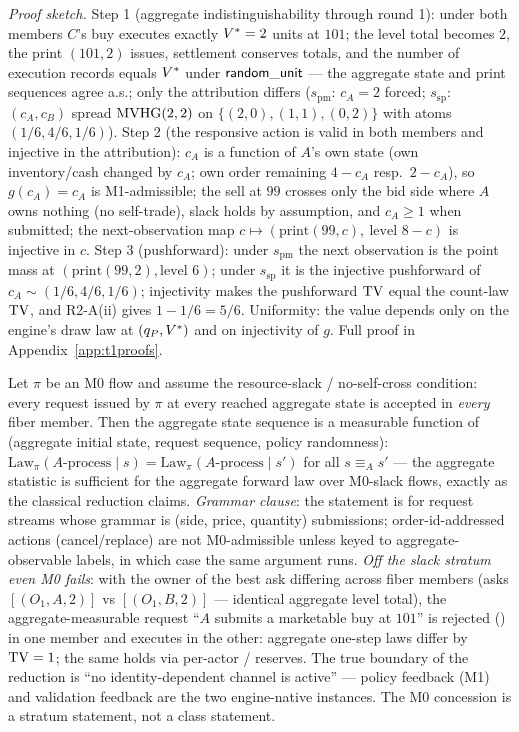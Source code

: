 \emph{Proof sketch.} Step 1 (aggregate indistinguishability through round
1): under both members $C$'s buy executes exactly $V^{*} = 2$ units at
$101$; the level total becomes $2$, the print $(101,2)$ issues, settlement
conserves totals, and the number of execution records equals $V^{*}$
under $\mathsf{random\_unit}$ --- the aggregate state and print sequences agree a.s.; only
the attribution differs ($s_{\mathrm{pm}}$: $c_A = 2$ forced;
$s_{\mathrm{sp}}$: $(c_A, c_B)$ spread $\operatorname{MVHG}(2,2)$ on
$\{(2,0),(1,1),(0,2)\}$ with atoms $(1/6, 4/6, 1/6)$). Step 2 (the
responsive action is valid in both members and injective in the
attribution): $c_A$ is a function of $A$'s own state (own inventory/cash
changed by $c_A$; own order remaining $4 - c_A$ resp.\ $2 - c_A$), so
$g(c_A) = c_A$ is M1-admissible; the sell at $99$ crosses only the bid side
where $A$ owns nothing (no self-trade), slack holds by assumption, and
$c_A \geq 1$ when submitted; the next-observation map $c \mapsto
(\text{print}(99,c),\ \text{level } 8-c)$ is injective in $c$. Step 3
(pushforward): under $s_{\mathrm{pm}}$ the next observation is the point
mass at $(\text{print}(99,2), \text{level }6)$; under $s_{\mathrm{sp}}$ it
is the injective pushforward of $c_A \sim (1/6,4/6,1/6)$; injectivity makes
the pushforward $\operatorname{TV}$ equal the count-law $\operatorname{TV}$, and R2-A(ii) gives $1 - 1/6
= 5/6$. Uniformity: the value depends only on the engine's draw law at
$(q_{P}, V^{*})$ and on injectivity of $g$. Full proof in
Appendix~\ref{app:t1proofs}.

\begin{proposition}
\label{prop:t1-r2c}
Let $\pi$ be an M0 flow and assume the resource-slack / no-self-cross
condition: every request issued by $\pi$ at every reached aggregate state is
accepted in \emph{every} fiber member. Then the aggregate state sequence is
a measurable function of (aggregate initial state, request sequence, policy
randomness): $\mathrm{Law}_{\pi}(A\text{-process} \mid s) =
\mathrm{Law}_{\pi}(A\text{-process} \mid s')$ for all $s \equiv_A s'$ ---
the aggregate statistic is sufficient for the aggregate forward law over
M0-slack flows, exactly as the classical reduction claims.
\emph{Grammar clause}: the statement is for request streams whose grammar is
(side, price, quantity) submissions; order-id-addressed actions
(cancel/replace) are not M0-admissible unless keyed to aggregate-observable
labels, in which case the same argument runs. \emph{Off the slack stratum
even M0 fails}: with the owner of the best ask differing across fiber
members (asks $[(O_1, A, 2)]$ vs $[(O_1, B, 2)]$ --- identical aggregate
level total), the aggregate-measurable request ``$A$ submits a marketable
buy at $101$'' is rejected () in one member and
executes in the other: aggregate one-step laws differ by $\operatorname{TV} = 1$; the
same holds via per-actor /
reserves. The true boundary of the reduction is ``no identity-dependent
channel is active'' --- policy feedback (M1) and validation feedback are the
two engine-native instances. The M0 concession is a stratum statement, not a
class statement.
\end{proposition}

